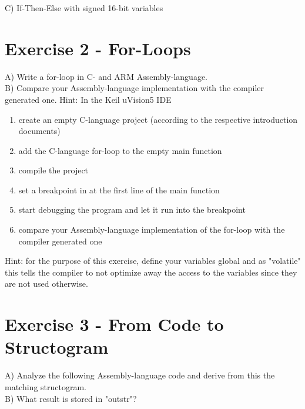 C) If-Then-Else with signed 16-bit variables

\section*{Exercise 2 - For-Loops}
A) Write a for-loop in C- and ARM Assembly-language.\\
B) Compare your Assembly-language implementation with the compiler generated one. Hint: In the Keil uVision5 IDE

\begin{enumerate}
  \item create an empty C-language project (according to the respective introduction documents)
  \item add the C-language for-loop to the empty main function
  \item compile the project
  \item set a breakpoint in at the first line of the main function
  \item start debugging the program and let it run into the breakpoint
  \item compare your Assembly-language implementation of the for-loop with the compiler generated one
\end{enumerate}

Hint: for the purpose of this exercise, define your variables global and as "volatile" this tells the compiler to not optimize away the access to the variables since they are not used otherwise.

\section*{Exercise 3 - From Code to Structogram}
A) Analyze the following Assembly-language code and derive from this the matching structogram.\\
B) What result is stored in "outstr"?

